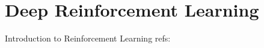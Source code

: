 \documentclass[../main.tex]{subfiles}
\begin{document}
	\chapter{Deep Reinforcement Learning}
	
	\begin{section}{Introduction to Reinforcement Learning}
			refs: \cite{bertsekas1996neuro} \cite{sutton2018reinforcement} 
	\end{section}

	
	
	
\end{document}
